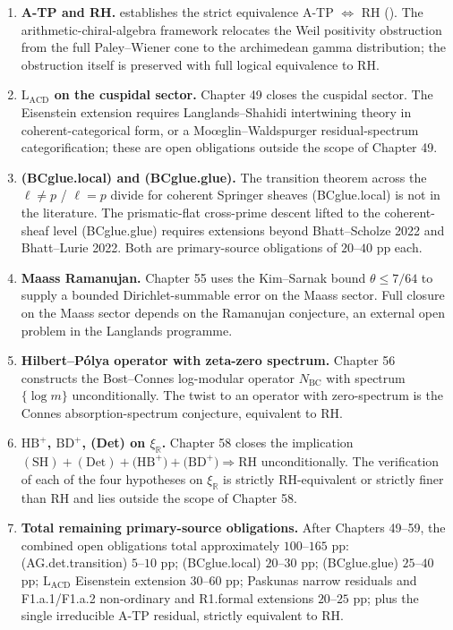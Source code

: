 \begin{enumerate}
\item \textbf{A-TP and RH.}
 establishes the
strict equivalence A-TP \(\Leftrightarrow\) RH
(). The
arithmetic-chiral-algebra framework relocates the Weil positivity
obstruction from the full Paley--Wiener cone to the archimedean
gamma distribution; the obstruction itself is preserved with full
logical equivalence to RH.
\item \textbf{\(\mathrm{L}_{\mathrm{ACD}}\) on the cuspidal sector.}
Chapter 49 closes the cuspidal sector. The Eisenstein extension
requires Langlands--Shahidi intertwining theory in coherent-categorical
form, or a Mo{\oe}glin--Waldspurger residual-spectrum
categorification; these are open obligations outside the scope of
Chapter 49.
\item \textbf{(BCglue.local) and (BCglue.glue).}
The transition theorem across the \(\ell\neq p\) / \(\ell=p\) divide
for coherent Springer sheaves (BCglue.local) is not in the literature.
The prismatic-flat cross-prime descent lifted to the coherent-sheaf
level (BCglue.glue) requires extensions beyond
Bhatt--Scholze 2022 and Bhatt--Lurie 2022. Both are primary-source
obligations of \(20\)--\(40\) pp each.
\item \textbf{Maass Ramanujan.}
Chapter 55 uses the Kim--Sarnak bound
\(\theta \leq 7/64\) to supply a bounded Dirichlet-summable error on
the Maass sector. Full closure on the Maass sector depends on the
Ramanujan conjecture, an external open problem in the Langlands
programme.
\item \textbf{Hilbert--P\'{o}lya operator with zeta-zero spectrum.}
Chapter 56 constructs the Bost--Connes log-modular operator
\(N_{\mathrm{BC}}\) with spectrum \(\{\log m\}\) unconditionally.
The twist to an operator with zero-spectrum is the Connes
absorption-spectrum conjecture, equivalent to RH.
\item \textbf{\(\mathrm{HB}^{+}\), \(\mathrm{BD}^{+}\), (Det) on \(\xi_{\mathbb{R}}\).}
Chapter 58 closes the implication
\(\mathrm{(SH)}+\mathrm{(Det)}+\mathrm{(HB}^{+})+\mathrm{(BD}^{+})
\Rightarrow \mathrm{RH}\) unconditionally. The verification of each
of the four hypotheses on \(\xi_{\mathbb{R}}\) is strictly
RH-equivalent or strictly finer than RH and lies outside the scope
of Chapter 58.
\item \textbf{Total remaining primary-source obligations.}
After Chapters 49--59, the combined open obligations total
approximately \(100\)--\(165\) pp: (AG.det.transition) \(5\)--\(10\) pp;
(BCglue.local) \(20\)--\(30\) pp; (BCglue.glue) \(25\)--\(40\) pp;
\(\mathrm{L}_{\mathrm{ACD}}\) Eisenstein extension \(30\)--\(60\) pp;
Paskunas narrow residuals and F1.a.1/F1.a.2 non-ordinary and
R1.formal extensions \(20\)--\(25\) pp; plus the single irreducible
A-TP residual, strictly equivalent to RH.
\end{enumerate}

